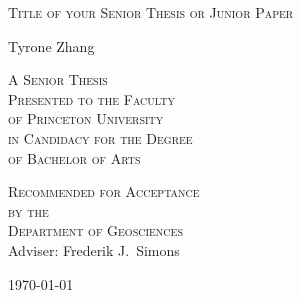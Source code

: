 \thispagestyle{empty}
  \begin{center}
    \textsc{\LARGE Title of your Senior Thesis or Junior Paper} %
  \end{center}
  \vspace{.6in}
  \begin{center}
      Tyrone Zhang
  \end{center}
  \vspace{.6in}
  \begin{center}
    \textsc{A Senior Thesis \\ %
    Presented to the Faculty \\
    of Princeton University \\
    in Candidacy for the Degree \\
    of Bachelor of Arts}
  \end{center}
  \vspace{.3in}
  \begin{center}
    \textsc{Recommended for Acceptance \\
    by the \\Department of  Geosciences \\}
    Adviser: Frederik J.~Simons
  \end{center}
  \vspace{.3in}
  \begin{center}
  \today
  \end{center}
  
  \clearpage
